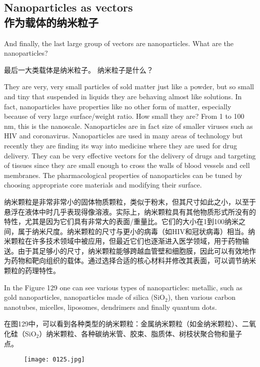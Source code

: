 \documentclass[dvipsnames, svgnames,a4paper,11pt]{article}
\begin{document}
\subsection{Nanoparticles as vectors \\作为载体的纳米粒子}


And finally, the last large group of vectors are nanoparticles. What are the
nanoparticles?

最后一大类载体是纳米粒子。 纳米粒子是什么？

They are very, very small particles of sold matter just like a powder, but so small and
tiny that suspended in liquids they are behaving almost like solutions. In fact,
nanoparticles have properties like no other form of matter, especially because of
very large surface/weight ratio. How small they are? From 1 to 100 nm, this is the
nanoscale. Nanoparticles are in fact size of smaller viruses such as HIV and
coronavirus. Nanoparticles are used in many areas of technology but recently they
are finding its way into medicine where they are used for drug delivery. They can be
very effective vectors for the delivery of drugs and targeting of tissues since they are
small enough to cross the walls of blood vessels and cell membranes. The
pharmacological properties of nanoparticles can be tuned by choosing appropriate
core materials and modifying their surface.

纳米颗粒是非常非常小的固体物质颗粒，类似于粉末，但其尺寸如此之小，以至于悬浮在液体中时几乎表现得像溶液。实际上，纳米颗粒具有其他物质形式所没有的特性，尤其是因为它们具有非常大的表面/重量比。它们的大小在1到100纳米之间，属于纳米尺度。纳米颗粒的尺寸与更小的病毒（如HIV和冠状病毒）相当。纳米颗粒在许多技术领域中被应用，但最近它们也逐渐进入医学领域，用于药物输送。由于其足够小的尺寸，纳米颗粒能够跨越血管壁和细胞膜，因此可以有效地作为药物和靶向组织的载体。通过选择合适的核心材料并修改其表面，可以调节纳米颗粒的药理特性。

In the Figure 129 one can see various types of nanoparticles: metallic, such as gold
nanoparticles, nanoparticles made of silica (SiO${}_2$), then various carbon nanotubes,
micelles, liposomes, dendrimers and finally quantum dots.

在图129中，可以看到各种类型的纳米颗粒：金属纳米颗粒（如金纳米颗粒）、二氧化硅（SiO${}_2$）纳米颗粒、各种碳纳米管、胶束、脂质体、树枝状聚合物和量子点。

\begin{figure}[h]
	\centering
    \texttt{[image: 0125.jpg]}    
     \label{fig129}
\end{figure}
\end{document}
